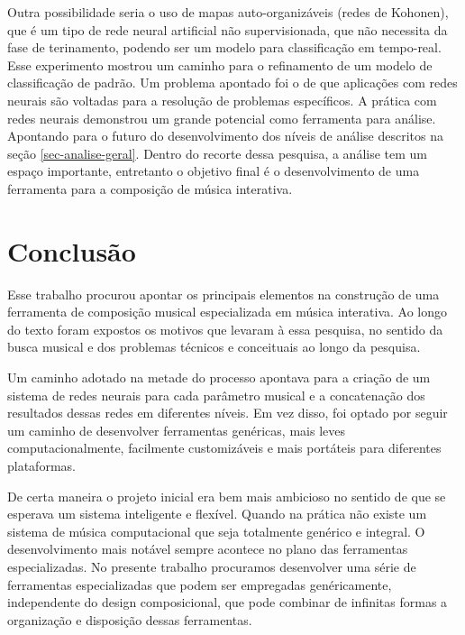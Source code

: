 \documentclass{ppgmus}
\begin{document}
Outra possibilidade seria o uso de mapas auto-organizáveis (redes de Kohonen), que é
um tipo de rede neural artificial não supervisionada, que não necessita
da fase de terinamento, podendo ser um modelo para classificação em tempo-real.
Esse experimento mostrou um caminho para o refinamento de um modelo de classificação de padrão.
Um problema apontado foi o de que aplicações com redes neurais são voltadas
para a resolução de problemas específicos.
A prática com redes neurais demonstrou um grande potencial como ferramenta para análise. Apontando
para o futuro do desenvolvimento dos níveis de análise descritos na seção \ref{sec-analise-geral}.
Dentro do recorte dessa pesquisa, a análise tem um espaço importante, entretanto o objetivo
final é o desenvolvimento de uma ferramenta para a composição de música interativa.








\section{Conclusão}


Esse trabalho procurou apontar os principais elementos na construção
de uma ferramenta de composição musical especializada em música 
interativa. Ao longo do texto foram expostos os motivos que levaram
à essa pesquisa, no sentido da busca musical e dos problemas
técnicos e conceituais ao longo da pesquisa.

 Um caminho adotado na metade do
processo apontava para a criação de um sistema de redes neurais 
para cada parâmetro musical e a concatenação dos resultados dessas redes
em diferentes níveis. Em vez disso, foi optado por seguir um caminho
de desenvolver ferramentas genéricas, mais leves computacionalmente,
facilmente customizáveis e mais portáteis para diferentes plataformas.

De certa maneira o projeto inicial era bem mais ambicioso no sentido
de que se esperava um sistema inteligente e flexível. 
Quando na prática
não existe um sistema de música computacional que seja totalmente genérico
e integral. O desenvolvimento mais notável sempre acontece no plano das ferramentas
especializadas. No presente trabalho procuramos desenvolver uma série
de ferramentas especializadas que podem ser empregadas genéricamente, independente
do design composicional, que pode combinar de infinitas formas a organização e 
disposição dessas ferramentas.  
\end{document}
